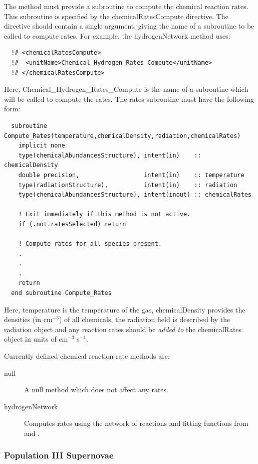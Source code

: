 The method must provide a subroutine to compute the chemical reaction rates. This subroutine is specified by the {\normalfont \ttfamily chemicalRatesCompute} directive. The directive should contain a single argument, giving the name of a subroutine to be called to compute rates. For example, the {\normalfont \ttfamily hydrogenNetwork} method uses:
\begin{verbatim}
  !# <chemicalRatesCompute>
  !#  <unitName>Chemical_Hydrogen_Rates_Compute</unitName>
  !# </chemicalRatesCompute> 
\end{verbatim}
Here, {\normalfont \ttfamily Chemical\_Hydrogen\_Rates\_Compute} is the name of a subroutine which will be called to compute the rates. The rates subroutine must have the following form:
\begin{verbatim}
  subroutine Compute_Rates(temperature,chemicalDensity,radiation,chemicalRates)
    implicit none
    type(chemicalAbundancesStructure), intent(in)    :: chemicalDensity
    double precision,                  intent(in)    :: temperature
    type(radiationStructure),          intent(in)    :: radiation
    type(chemicalAbundancesStructure), intent(inout) :: chemicalRates

    ! Exit immediately if this method is not active.
    if (.not.ratesSelected) return

    ! Compute rates for all species present.
    .
    .
    .
    return
  end subroutine Compute_Rates
\end{verbatim}
Here, {\normalfont \ttfamily temperature} is the temperature of the gas, {\normalfont \ttfamily chemicalDensity} provides the densities (in cm$^{-3}$) of all chemicals, the radiation field is described by the {\normalfont \ttfamily radiation} object and any reaction rates should be \emph{added to} the {\normalfont \ttfamily chemicalRates} object in units of cm$^{-3}$ s$^{-1}$.

Currently defined chemical reaction rate methods are:
\begin{description}
 \item [{\normalfont \ttfamily null}] A null method which does not affect any rates.
 \item [{\normalfont \ttfamily hydrogenNetwork}] Computes rates using the network of reactions and fitting functions from \cite{abel_modeling_1997} and \cite{tegmark_small_1997}.
\end{description}

\subsubsection{Population III Supernovae}


